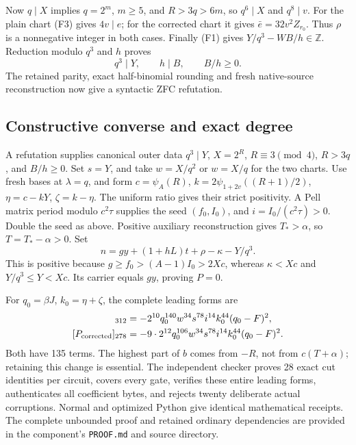 Now \(q\mid X\) implies \(q=2^m\), \(m\ge5\), and
\(R>3q>6m\), so \(q^6\mid X\) and \(q^8\mid v\).
For the plain chart (F3) gives \(4v\mid e\); for the corrected
chart it gives \(\bar e=32v^2Z_{r_0}\). Thus \(\rho\) is a
nonnegative integer in both cases. Finally (F1) gives
\(Y/q^3-WB/h\in\mathbb Z\). Reduction modulo \(q^3\)
and \(h\) proves
\[
 q^3\mid Y,\qquad h\mid B,\qquad B/h\ge0.
\]
The retained parity, exact half-binomial rounding and fresh native-source
reconstruction now give a syntactic ZFC refutation.

\subsection{Constructive converse and exact degree}

A refutation supplies canonical outer data \(q^3\mid Y\),
\(X=2^R\), \(R\equiv3\pmod4\), \(R>3q\), and
\(B/h\ge0\). Set \(s=Y\), and take \(w=X/q^2\) or
\(w=X/q\) for the two charts. Use fresh bases at \(\lambda=q\),
and form \(c=\psi_A(R)\),
\(k=2\psi_{1+2v}((R+1)/2)\),
\(\eta=c-kY\), \(\zeta=k-\eta\).
The uniform ratio gives their strict positivity. A Pell matrix period
modulo \(c^2\tau\) supplies the seed \((f_0,I_0)\), and
\(i=I_0/(c^2\tau)>0\). Double the seed as above. Positive
auxiliary reconstruction gives \(T_*>\alpha\), so
\(T=T_*-\alpha>0\). Set
\[
 n=gy+(1+hL)t+\rho-\kappa-Y/q^3.
\]
This is positive because
\(g\ge f_0>(A-1)I_0>2Xc\), whereas
\(\kappa<Xc\) and \(Y/q^3\le Y<Xc\).
Its carrier equals \(gy\), proving \(P=0\).

For \(q_0=\beta J\), \(k_0=\eta+\zeta\), the complete leading
forms are
\begin{align*}
 [P_{\rm plain}]_{312}
   &=-2^{10}q_0^{140}w^{34}s^{78}i^{14}k_0^{44}(q_0-F)^2,\\
 [P_{\rm corrected}]_{278}
   &=-9\cdot2^{12}q_0^{106}w^{34}s^{78}i^{14}k_0^{44}(q_0-F)^2.
\end{align*}
Both have 135 terms. The highest part of \(b\) comes from \(-R\),
not from \(c(T+\alpha)\); retaining this change is essential.
The independent checker proves 28 exact cut identities per circuit,
covers every gate, verifies these entire leading forms, authenticates
all coefficient bytes, and rejects twenty deliberate actual corruptions.
Normal and optimized Python give identical mathematical receipts.
The complete unbounded proof and retained ordinary dependencies are
provided in the component's \texttt{PROOF.md} and source directory.
